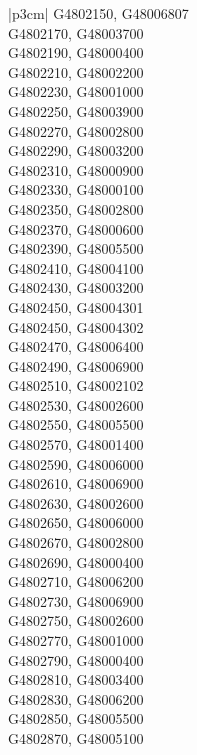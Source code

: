 \begin{customLongTable}{ |p{3cm}| }
G4802150, G48006807 \\ \hline
G4802170, G48003700 \\ \hline
G4802190, G48000400 \\ \hline
G4802210, G48002200 \\ \hline
G4802230, G48001000 \\ \hline
G4802250, G48003900 \\ \hline
G4802270, G48002800 \\ \hline
G4802290, G48003200 \\ \hline
G4802310, G48000900 \\ \hline
G4802330, G48000100 \\ \hline
G4802350, G48002800 \\ \hline
G4802370, G48000600 \\ \hline
G4802390, G48005500 \\ \hline
G4802410, G48004100 \\ \hline
G4802430, G48003200 \\ \hline
G4802450, G48004301 \\ \hline
G4802450, G48004302 \\ \hline
G4802470, G48006400 \\ \hline
G4802490, G48006900 \\ \hline
G4802510, G48002102 \\ \hline
G4802530, G48002600 \\ \hline
G4802550, G48005500 \\ \hline
G4802570, G48001400 \\ \hline
G4802590, G48006000 \\ \hline
G4802610, G48006900 \\ \hline
G4802630, G48002600 \\ \hline
G4802650, G48006000 \\ \hline
G4802670, G48002800 \\ \hline
G4802690, G48000400 \\ \hline
G4802710, G48006200 \\ \hline
G4802730, G48006900 \\ \hline
G4802750, G48002600 \\ \hline
G4802770, G48001000 \\ \hline
G4802790, G48000400 \\ \hline
G4802810, G48003400 \\ \hline
G4802830, G48006200 \\ \hline
G4802850, G48005500 \\ \hline
G4802870, G48005100 \\ \hline

\end{customLongTable}
